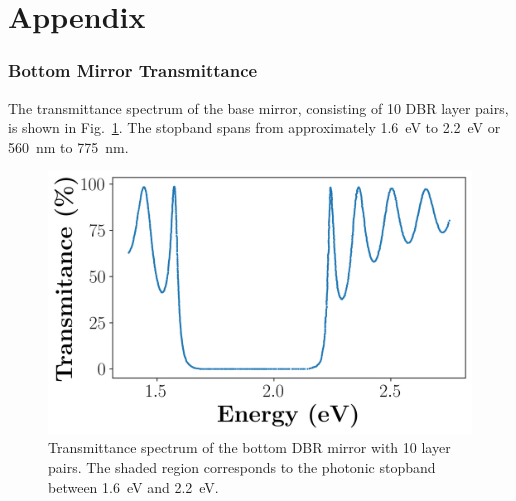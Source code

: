 \section{Appendix \label{sec:appendix}}

\subsubsection*{Bottom Mirror Transmittance}

The transmittance spectrum of the base mirror, consisting of 10 DBR layer pairs, is shown in Fig.~\ref{fig:trans}. The stopband spans from approximately 1.6~eV to 2.2~eV or 560~nm to 775~nm.

\begin{figure}[h]
    \centering
    \includegraphics[width=0.5\linewidth]{Figures/Transmitance.png}
    \caption{Transmittance spectrum of the bottom DBR mirror with 10 layer pairs. The shaded region corresponds to the photonic stopband between 1.6~eV and 2.2~eV.}
    \label{fig:trans}
\end{figure}